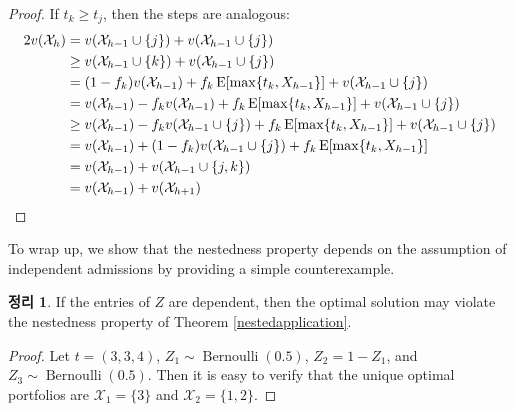 \documentclass[12pt]{article} %
\newtheorem{theorem}{Theorem}
\theoremstyle{definition}
\newtheorem{theorem}{정리}
\theoremstyle{definition}
\begin{document}
\begin{proof}
If $t_k \geq t_j$, then the steps are analogous:
\begin{align}
2 v(\mathcal{X}_h) &= v(\mathcal{X}_{h-1} \cup\{j\}) + v(\mathcal{X}_{h-1} \cup\{j\}) \\
&\geq v(\mathcal{X}_{h-1} \cup\{k\}) + v(\mathcal{X}_{h-1} \cup\{j\}) \\
&= (1 - f_k) v(\mathcal{X}_{h-1}) + f_k \operatorname{E}[\max\{t_k, X_{h-1}\}] +  v(\mathcal{X}_{h-1} \cup\{j\})  \\
&= v(\mathcal{X}_{h-1}) - f_k  v(\mathcal{X}_{h-1}) + f_k \operatorname{E}[\max\{t_k, X_{h-1}\}] +  v(\mathcal{X}_{h-1} \cup\{j\})  \\
&\geq v(\mathcal{X}_{h-1}) - f_k  v(\mathcal{X}_{h-1}\cup\{j\}) + f_k \operatorname{E}[\max\{t_k, X_{h-1}\}] +  v(\mathcal{X}_{h-1} \cup\{j\})  \\
&= v(\mathcal{X}_{h-1}) + (1 - f_k) v(\mathcal{X}_{h-1}\cup\{j\}) + f_k \operatorname{E}[\max\{t_k, X_{h-1}\}]  \\
&= v(\mathcal{X}_{h-1}) + v(\mathcal{X}_{h-1} \cup\{j, k\})\\
&= v(\mathcal{X}_{h-1})  + v(\mathcal{X}_{h+1})
\qedhere
\end{align}
\end{proof}



To wrap up, we show that the nestedness property depends on the assumption of independent admissions by providing a simple counterexample.


\begin{theorem}
If the entries of $Z$ are dependent, then the optimal solution may violate the nestedness property of Theorem \ref{nestedapplication}.
\end{theorem}

\begin{proof}
Let $t = (3, 3, 4)$, $Z_1 \sim \operatorname{Bernoulli}(0.5)$, $Z_2 = 1 - Z_1$,  and $Z_3 \sim \operatorname{Bernoulli}(0.5)$. Then it is easy to verify that the unique optimal portfolios are $\mathcal{X}_1 = \{3\}$ and $\mathcal{X}_2 = \{1, 2\}$. 
\end{proof}
\end{document}
